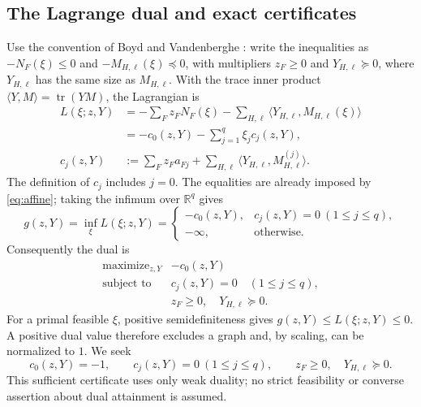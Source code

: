 \documentclass[11pt]{article}
\theoremstyle{remark}
\newcommand{\R}{\mathbb R}
\DeclareMathOperator{\tr}{tr}
\numberwithin{equation}{section}
\begin{document}
\subsection{The Lagrange dual and exact certificates}\label{subsec:dual}
Use the convention of Boyd and Vandenberghe
\cite[Sections~5.8.1 and~5.9.1]{boyd}: write the inequalities as
$-N_F(\xi)\le0$ and $-M_{H,\ell}(\xi)\preceq0$, with multipliers
$z_F\ge0$ and $Y_{H,\ell}\succeq0$, where $Y_{H,\ell}$ has the same
size as $M_{H,\ell}$. With the trace inner product
$\langle Y,M\rangle=\tr(YM)$, the Lagrangian is
\begin{align}
 L(\xi;z,Y)&=-\sum_Fz_FN_F(\xi)-
 \sum_{H,\ell}\langle Y_{H,\ell},M_{H,\ell}(\xi)\rangle\nonumber\\
 &=-c_0(z,Y)-\sum_{j=1}^q\xi_jc_j(z,Y),\label{eq:lagrangian}\\
 c_j(z,Y)&:=\sum_Fz_Fa_{Fj}+
 \sum_{H,\ell}\langle Y_{H,\ell},M_{H,\ell}^{(j)}\rangle.
 \nonumber
\end{align}
The definition of $c_j$ includes $j=0$.
The equalities are already imposed by \eqref{eq:affine}; taking the
infimum over $\R^q$ gives
\[
 g(z,Y)=\inf_\xi L(\xi;z,Y)=
 \begin{cases}-c_0(z,Y),&c_j(z,Y)=0\ (1\le j\le q),\\
 -\infty,&\text{otherwise}.
 \end{cases}
\]
Consequently the dual is
\begin{equation}\label{eq:dual}
 \begin{array}{ll}
 \text{maximize}_{z,Y}&-c_0(z,Y)\\
 \text{subject to}&c_j(z,Y)=0\quad(1\le j\le q),\\
 &z_F\ge0,\quad Y_{H,\ell}\succeq0.
 \end{array}
\end{equation}
For a primal feasible $\xi$, positive semidefiniteness gives
$g(z,Y)\le L(\xi;z,Y)\le0$. A positive dual value therefore excludes
a graph and, by scaling, can be normalized to $1$. We seek
\begin{equation}\label{eq:normaldual}
 c_0(z,Y)=-1,\qquad c_j(z,Y)=0\ (1\le j\le q),\qquad
 z_F\ge0,\quad Y_{H,\ell}\succeq0.
\end{equation}
This sufficient certificate uses only weak duality; no strict feasibility
or converse assertion about dual attainment is assumed.
\end{document}
